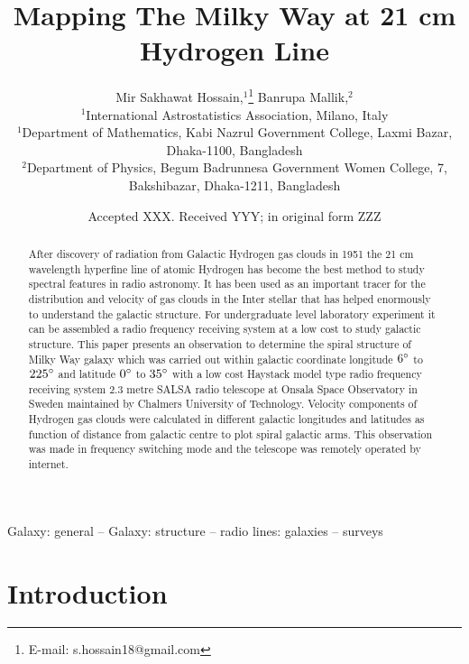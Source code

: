 \documentclass[fleqn,usenatbib]{mnras}
\title[Running Head]{Mapping The Milky Way at 21 cm Hydrogen Line}
\author[Mir Sakhawat Hossain et al.]{
Mir Sakhawat Hossain,$^{1}$\thanks{E-mail: s.hossain18@gmail.com}
Banrupa Mallik,$^{2}$
\\
$^{1}$International Astrostatistics Association, Milano, Italy\\
$^{1}$Department of Mathematics, Kabi Nazrul Government College, Laxmi Bazar, Dhaka-1100, Bangladesh\\
$^{2}$Department of Physics, Begum Badrunnesa Government Women College, 7, Bakshibazar, Dhaka-1211, Bangladesh
}
\date{Accepted XXX. Received YYY; in original form ZZZ}
\begin{document}
\label{firstpage}
\pagerange{\pageref{firstpage}--\pageref{lastpage}}
\maketitle

\begin{abstract}

After discovery of radiation from Galactic Hydrogen gas clouds in 1951 the 21 cm wavelength hyperfine line of atomic Hydrogen has become the best method to study spectral features in radio astronomy. It has been used as an important tracer for the distribution and velocity of gas clouds in the Inter stellar that has helped enormously to understand the galactic structure. For undergraduate level laboratory experiment it can be assembled a radio frequency receiving system at a low cost to study galactic structure. This paper presents an observation to determine the spiral structure of Milky Way galaxy which was carried out within galactic coordinate longitude $6\hbox{$^\circ$}$ to $225\hbox{$^\circ$}$ and latitude $0\hbox{$^\circ$}$ to $35\hbox{$^\circ$}$ with a low cost Haystack model type radio frequency receiving system $2.3$ metre SALSA radio telescope at Onsala Space Observatory in Sweden maintained by Chalmers University of Technology. Velocity components of Hydrogen gas clouds were calculated in different galactic longitudes and latitudes as function of distance from galactic centre to plot spiral galactic arms. This observation was made in frequency switching mode and the telescope was remotely operated by internet.
\end{abstract}

\begin{keywords}
Galaxy: general -- Galaxy: structure -- radio lines: galaxies -- surveys
\end{keywords}



\section{Introduction}
\end{document}
